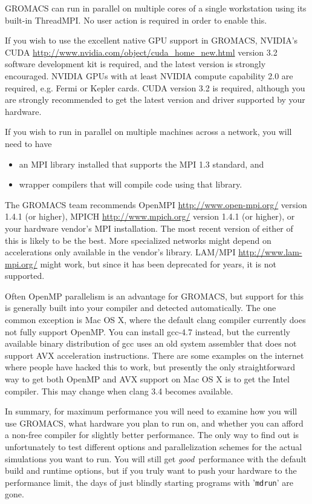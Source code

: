 \documentclass{article}[12pt,a4paper,twoside]
\newcommand{\gromacs}{GROMACS}
\newcommand{\nvidia}{NVIDIA}
\newcommand{\cuda}{CUDA}
\newcommand{\mpi}{MPI}
\newcommand{\threadmpi}{ThreadMPI}
\newcommand{\openmpi}{OpenMPI}
\newcommand{\openmp}{OpenMP}
\newcommand{\lammpi}{LAM/MPI}
\newcommand{\mpich}{MPICH}
\newcommand{\avx}{AVX}
\newcommand{\cudaversion}{3.2}
\begin{document}
\gromacs{} can run in parallel on multiple cores of a single
workstation using its built-in \threadmpi. No user action is required
in order to enable this.

If you wish to use the excellent native GPU support in \gromacs,
\nvidia{}'s \cuda{}
\url{http://www.nvidia.com/object/cuda_home_new.html} version
\cudaversion{} software development kit is required, and the latest
version is strongly encouraged. \nvidia{} GPUs with at least \nvidia{}
compute capability 2.0 are required, e.g. Fermi or Kepler cards. CUDA
version 3.2 is required, although you are strongly recommended to get
the latest version and driver supported by your hardware.

If you wish to run in parallel on multiple machines across a network,
you will need to have
\begin{itemize}
\item an \mpi{} library installed that supports the \mpi{} 1.3
  standard, and
\item wrapper compilers that will compile code using that library.
\end{itemize}
The \gromacs{} team recommends \openmpi{}
\url{http://www.open-mpi.org/} version 1.4.1 (or higher), \mpich{}
\url{http://www.mpich.org/} version 1.4.1 (or higher), or your
hardware vendor's \mpi{} installation. The most recent version of
either of this is likely to be the best. More specialized networks
might depend on accelerations only available in the vendor's library.
 \lammpi{}
\url{http://www.lam-mpi.org/} might work, but since it has been
deprecated for years, it is not supported.

Often \openmp{} parallelism is an advantage for \gromacs{},
but support for this is generally built into your compiler and detected
automatically. The one common exception is Mac OS X, where the default
clang compiler currently does not fully support OpenMP. You can install
gcc-4.7 instead, but the currently available binary distribution of gcc 
uses an old system assembler that does not support \avx{} acceleration
instructions. There are some examples on the internet where people have
hacked this to work, but presently the only straightforward way to get
both OpenMP and \avx{} support on Mac OS X is to get the Intel compiler.
This may change when clang 3.4 becomes available.

In summary, for maximum performance you will need to 
examine how you will use \gromacs{}, what hardware you plan to run
on, and whether you can afford a non-free compiler for slightly better
performance. The only way to find out is unfortunately to test different
options and parallelization schemes for the actual simulations you
want to run. You will still get {\em good}\, performance with the default
build and runtime options, but if you truly want to push your hardware
to the performance limit, the days of just blindly starting programs
with '\verb+mdrun+' are gone.
\end{document}
